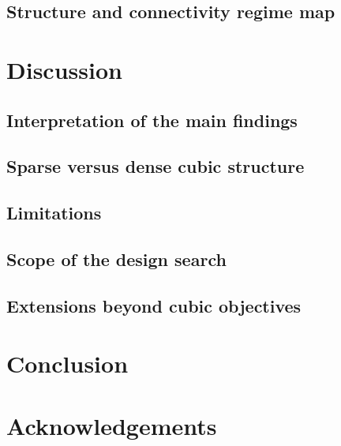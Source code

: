 \documentclass[a4paper,onecolumn,11pt,unpublished]{quantumarticle}
\newcommand{\blankcontent}{\noindent\mbox{}\par}
\theoremstyle{remark}
\begin{document}
\subsection{Structure and connectivity regime map}
\blankcontent

\section{Discussion}
\label{sec:discussion}

\subsection{Interpretation of the main findings}
\blankcontent

\subsection{Sparse versus dense cubic structure}

\subsection{Limitations}
\subsection{Scope of the design search}
\label{sec:discussion-search-scope}



\subsection{Extensions beyond cubic objectives}

\section{Conclusion}
\label{sec:conclusion}


\section*{Acknowledgements}
\blankcontent
\end{document}
